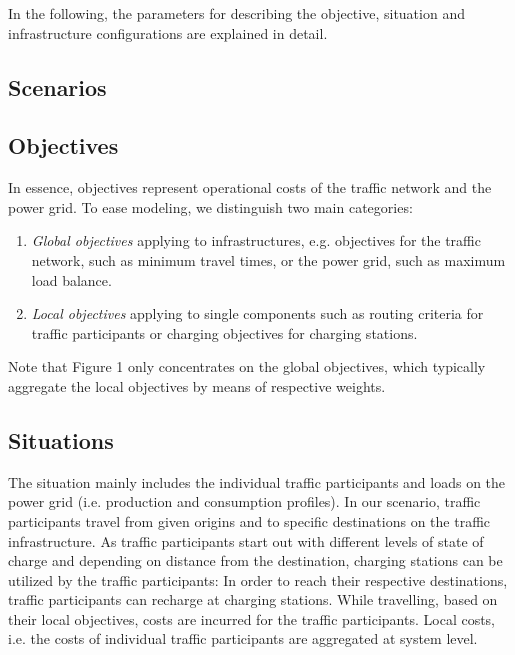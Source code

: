 \documentclass[conference]{IEEEtran}
\begin{document}
In the following, the parameters for describing the objective, situation and
infrastructure configurations are explained in detail.

\subsection{Scenarios}

\subsection{Objectives}
In essence, objectives represent operational costs of the traffic network and the power grid. To ease modeling, we distinguish two main categories:
\begin{enumerate}
  \item \textit{Global objectives} applying to infrastructures, e.g. objectives
  for the traffic network, such as minimum travel times, or the power grid, such as maximum load balance.
  \item \textit{Local objectives} applying to single components such as routing
  criteria for traffic participants or charging objectives for charging stations.
\end{enumerate}

Note that Figure 1 only concentrates on the global objectives, which typically aggregate the local objectives by means of respective weights.

\subsection{Situations}
The situation mainly includes the individual traffic participants and loads on
the power grid (i.e. production and consumption profiles). In our scenario, traffic participants travel from given origins and to specific destinations on the traffic infrastructure. As traffic participants start out with different levels of state of charge and depending on distance from the destination, charging stations can be utilized by the traffic participants: In order to reach their respective destinations, traffic participants can recharge at charging stations. While travelling, based on their local objectives, costs are incurred for the traffic participants. Local costs, i.e. the costs of individual traffic participants are aggregated at system level.
\end{document}
